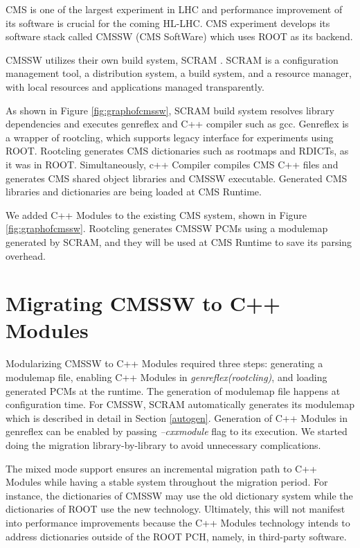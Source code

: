 \documentclass[12pt]{iopart}
\begin{document}
CMS \cite{cms} is one of the largest experiment in LHC and performance improvement of its software is crucial for the coming HL-LHC. CMS experiment develops its software stack called CMSSW (CMS SoftWare) which uses ROOT as its backend.

CMSSW utilizes their own build system, SCRAM \cite{scram}. SCRAM is a configuration management tool, a distribution system, a build system, and a resource manager, with local resources and applications managed transparently.

As shown in Figure \ref{fig:graphofcmssw}, SCRAM build system resolves library dependencies and executes genreflex and C++ compiler such as gcc. Genreflex is a wrapper of rootcling, which supports legacy interface for experiments using ROOT. Rootcling generates CMS dictionaries such as rootmaps and RDICTs, as it was in ROOT. Simultaneously, c++ Compiler compiles CMS C++ files and generates CMS shared object libraries and CMSSW executable. Generated CMS libraries and dictionaries are being loaded at CMS Runtime.

We added C++ Modules to the existing CMS system, shown in Figure \ref{fig:graphofcmssw}. Rootcling generates CMSSW PCMs using a modulemap generated by SCRAM, and they will be used at CMS Runtime to save its parsing overhead.

\section{Migrating CMSSW to C++ Modules}
\label{migration}
Modularizing CMSSW to C++ Modules required three steps: generating a modulemap file, enabling C++ Modules in \textit{genreflex(rootcling)}, and loading generated PCMs at the runtime. The generation of modulemap file happens at configuration time. For CMSSW, SCRAM automatically generates its modulemap which is described in detail in Section \ref{autogen}. Generation of C++ Modules in genreflex can be enabled by passing \textit{--cxxmodule} flag to its execution. We started doing the migration library-by-library to avoid unnecessary complications.

The mixed mode support ensures an incremental migration path to C++ Modules while having a stable system throughout the migration period. For instance, the dictionaries of CMSSW may use the old dictionary system while the dictionaries of ROOT use the new technology. Ultimately, this will not manifest into performance improvements because the C++ Modules technology intends to address dictionaries outside of the ROOT PCH, namely, in third-party software.
\end{document}
